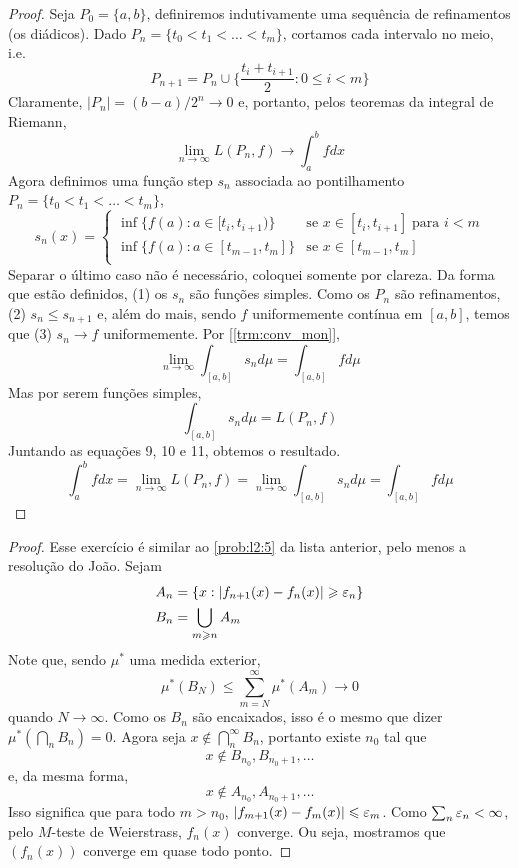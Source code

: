 \begin{proof}
    Seja $P_0 = \{a,b\}$, definiremos indutivamente uma sequência de refinamentos (os diádicos).
    Dado $P_n = \{t_0 < t_1 < \dots < t_m\}$, cortamos cada intervalo no meio, i.e.
    $$P_{n+1} = P_n \cup \bigg\{\frac{t_i + t_{i+1}}{2} : 0 \leq i < m\bigg\}$$
    Claramente, $|P_n| = (b-a)/2^n \to 0$ e, portanto, pelos teoremas da integral de Riemann,
    \begin{equation}
        \lim_{n \to \infty} L(P_n,f) \to \int_a^b fdx
    \end{equation}
    Agora definimos uma função step $s_n$ associada ao pontilhamento $P_n = \{t_0 < t_1 < \dots < t_m\}$,
    $$s_n(x) = \begin{cases}
        \inf\{f(a): a \in [t_i, t_{i+1})\} & \text{se } x \in [t_i, t_{i+1}]\; \text{para } i < m\\
        \inf\{f(a): a \in [t_{m-1}, t_{m}]\} & \text{se } x \in [t_{m-1}, t_{m}]\\
    \end{cases}$$
    Separar o último caso não é necessário, coloquei somente por clareza. Da forma que estão definidos,
    (1) os $s_n$ são funções simples. Como os $P_n$ são refinamentos, (2) $s_{n} \leq s_{n+1}$ e, além do mais,
    sendo $f$ uniformemente contínua em $[a,b]$, temos que (3) $s_n \to f$ uniformemente. Por [\ref{trm:conv_mon}],
    \begin{equation}
        \lim_{n\to \infty} \int_{[a,b]} s_n d\mu= \int_{[a,b]} f d\mu
    \end{equation}
    Mas por serem funções simples,
    \begin{equation}
        \int_{[a,b]} s_n d\mu = L(P_n, f)
    \end{equation}
    Juntando as equações 9, 10 e 11, obtemos o resultado.
    $$\int_a^b fdx = \lim_{n \to \infty} L(P_n, f) = \lim_{n\to\infty }\int_{[a,b]} s_n d\mu = \int_{[a,b]} fd\mu$$
\end{proof}

\begin{problem}
    \label{prob:l3:3}
\end{problem}
\begin{proof}
    Esse exercício é similar ao \ref{prob:l2:5} da lista anterior, pelo menos a resolução do João. Sejam 
    \begin{align*}
        A_n &= \{x : |f_{n+1}(x) - f_n(x)| \geqslant \varepsilon_n\}\\
        B_n &= \bigcup_{m \geqslant n} A_m
    \end{align*}
    Note que, sendo $\mu^*$ uma medida exterior,
    $$\mu^*(B_N) \leq \sum_{m = N}^{\infty} \mu^*(A_m) \to 0$$
    quando $N \to \infty$. Como os $B_n$ são encaixados, isso é o mesmo que dizer $\mu^*(\bigcap_n B_n) = 0$.
    Agora seja $x \not \in \bigcap_n^\infty B_n$, portanto existe $n_0$ tal que 
    $$ x \not \in B_{n_0}, B_{n_0 + 1}, \dots $$
    e, da mesma forma, 
    $$ x \not \in A_{n_0}, A_{n_0 + 1}, \dots$$
    Isso significa que para todo $m > n_0$, $|f_{m+1}(x) - f_{m}(x)| \leqslant \varepsilon_m$. Como
    $\sum_n \varepsilon_n < \infty$, pelo $M$-teste de Weierstrass, $f_n(x)$ converge. Ou seja, mostramos 
    que $(f_n(x))$ converge em quase todo ponto.
\end{proof}

